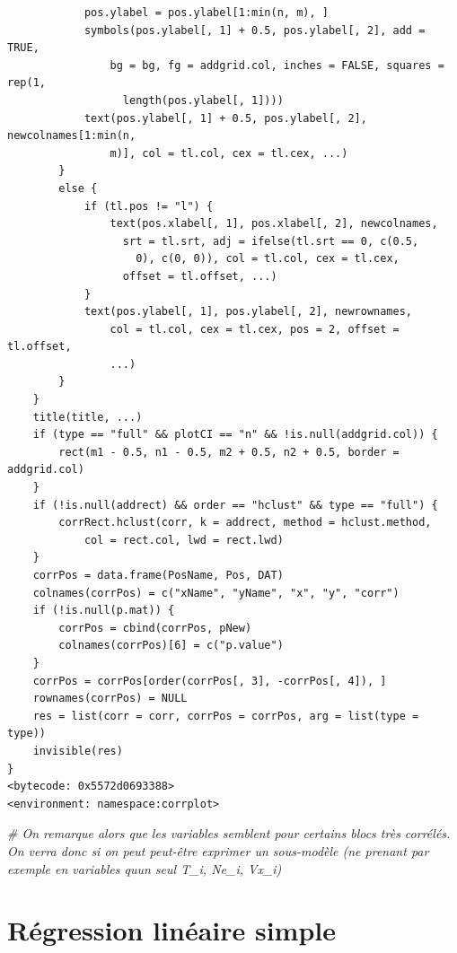 \documentclass[
]{article}
\newenvironment{Shaded}{\begin{snugshade}}{\end{snugshade}}
\newcommand{\CommentTok}[1]{\textcolor[rgb]{0.56,0.35,0.01}{\textit{#1}}}
\begin{document}
\begin{verbatim}
            pos.ylabel = pos.ylabel[1:min(n, m), ]
            symbols(pos.ylabel[, 1] + 0.5, pos.ylabel[, 2], add = TRUE, 
                bg = bg, fg = addgrid.col, inches = FALSE, squares = rep(1, 
                  length(pos.ylabel[, 1])))
            text(pos.ylabel[, 1] + 0.5, pos.ylabel[, 2], newcolnames[1:min(n, 
                m)], col = tl.col, cex = tl.cex, ...)
        }
        else {
            if (tl.pos != "l") {
                text(pos.xlabel[, 1], pos.xlabel[, 2], newcolnames, 
                  srt = tl.srt, adj = ifelse(tl.srt == 0, c(0.5, 
                    0), c(0, 0)), col = tl.col, cex = tl.cex, 
                  offset = tl.offset, ...)
            }
            text(pos.ylabel[, 1], pos.ylabel[, 2], newrownames, 
                col = tl.col, cex = tl.cex, pos = 2, offset = tl.offset, 
                ...)
        }
    }
    title(title, ...)
    if (type == "full" && plotCI == "n" && !is.null(addgrid.col)) {
        rect(m1 - 0.5, n1 - 0.5, m2 + 0.5, n2 + 0.5, border = addgrid.col)
    }
    if (!is.null(addrect) && order == "hclust" && type == "full") {
        corrRect.hclust(corr, k = addrect, method = hclust.method, 
            col = rect.col, lwd = rect.lwd)
    }
    corrPos = data.frame(PosName, Pos, DAT)
    colnames(corrPos) = c("xName", "yName", "x", "y", "corr")
    if (!is.null(p.mat)) {
        corrPos = cbind(corrPos, pNew)
        colnames(corrPos)[6] = c("p.value")
    }
    corrPos = corrPos[order(corrPos[, 3], -corrPos[, 4]), ]
    rownames(corrPos) = NULL
    res = list(corr = corr, corrPos = corrPos, arg = list(type = type))
    invisible(res)
}
<bytecode: 0x5572d0693388>
<environment: namespace:corrplot>
\end{verbatim}

\begin{Shaded}
\begin{Highlighting}[]
\CommentTok{\# On remarque alors que les variables semblent pour certains blocs très corrélés. On verra donc si on peut peut{-}être exprimer un sous{-}modèle (ne prenant par exemple en variables qu\textquotesingle{}un seul T\_i, Ne\_i, Vx\_i)}
\end{Highlighting}
\end{Shaded}

\hypertarget{ruxe9gression-linuxe9aire-simple}{%
\section{Régression linéaire
simple}\label{ruxe9gression-linuxe9aire-simple}}
\end{document}
